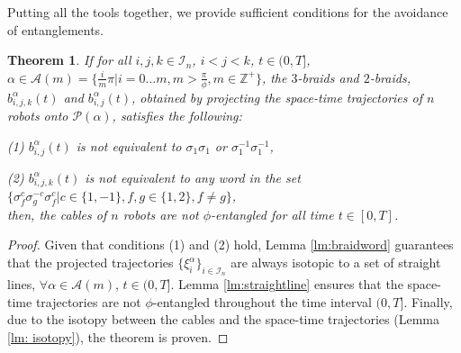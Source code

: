 \documentclass[conference]{IEEEtran}
\newtheorem{thm}{Theorem}[section]
\newcommand*{\myset}[1]{\mathcal{#1}} %
\newcommand*{\timet}{T} %
\newcommand*{\sptime}{\xi} %
\newcommand*{\projang}{\alpha} %
\newcommand*{\projplane}{\myset{P}} %
\newcommand*{\bgen}{\sigma} %
\newcommand*{\word}{b} %
\newcommand*{\entangledef}{\phi} %
\newcommand*{\angleset}{\myset{A}} %
\newcommand*{\numsample}{m} %
\newcommand*{\positiveinteger}{\mathbb{Z}^+}
\newcommand*{\dummyc}{c}
\newcommand*{\dummyf}{f}
\newcommand*{\dummyg}{g}
\begin{document}
Putting all the tools together, we provide sufficient conditions for the avoidance of entanglements.
\begin{thm}\label{thm:nonentangling}
If for all $i,j,k\in\myset{I}_n$, $i<j<k$, $t\in(0,\timet]$, $\projang\in\angleset(\numsample)=\{\frac{i}{\numsample}\pi|i=0\dots \numsample,\numsample>\frac{\pi}{\entangledef},m\in\positiveinteger\}$, 
the $3$-braids and $2$-braids, $\word^\projang_{i,j,k}(t)$ and $\word^\projang_{i,j}(t)$, obtained by projecting the space-time trajectories of $n$ robots onto $\projplane(\projang)$,  satisfies the following:

    (1) $\word^\projang_{i,j}(t)$ is not equivalent to $\bgen_1\bgen_1$ or $\bgen_1^{-1}\bgen_1^{-1}$,
    
    (2) $\word^\projang_{i,j,k}(t)$ is not equivalent to any word in the set 
    $\{\bgen_\dummyf^{\dummyc}\bgen^{-\dummyc}_\dummyg\bgen_\dummyf^{\dummyc}|\dummyc\in\{1,-1\},\dummyf,\dummyg\in\{1,2\}, \dummyf\neq g \}$,\\
    then, the cables of $n$ robots are not $\entangledef$-entangled for all time $t\in[0,\timet]$.
\end{thm}
\begin{proof}
Given that conditions (1) and (2) hold, Lemma \ref{lm:braidword} guarantees that the projected trajectories $\{\sptime_i^\projang\}_{i\in\myset{I}_n}$ are always isotopic to a set of straight lines, $\forall \projang\in\angleset(m)$, $t\in(0,T]$.
Lemma \ref{lm:straightline} ensures that the space-time trajectories are not $\entangledef$-entangled throughout the time interval $(0,T]$.
Finally, due to the isotopy between the cables and the space-time trajectories (Lemma \ref{lm: isotopy}), the theorem is proven.
\end{proof}
\end{document}
